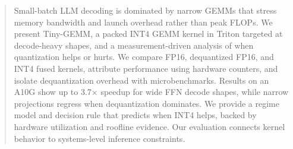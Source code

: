 \begin{abstract}
Small-batch LLM decoding is dominated by narrow GEMMs that stress memory
bandwidth and launch overhead rather than peak FLOPs. We present Tiny-GEMM, a
packed INT4 GEMM kernel in Triton targeted at decode-heavy shapes, and a
measurement-driven analysis of when quantization helps or hurts. We compare
FP16, dequantized FP16, and INT4 fused kernels, attribute performance using
hardware counters, and isolate dequantization overhead with microbenchmarks.
Results on an A10G show up to 3.7$\times$ speedup for wide FFN decode shapes,
while narrow projections regress when dequantization dominates. We provide a
regime model and decision rule that predicts when INT4 helps, backed by hardware
utilization and roofline evidence. Our evaluation connects kernel behavior to
systems-level inference constraints.
\end{abstract}

